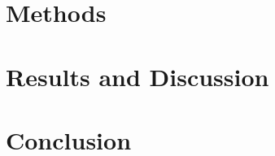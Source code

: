\documentclass[12pt]{article}
\begin{document}
  \section{Methods}\label{chap:methods}
  

  \section{Results and Discussion}\label{chap:results}
  

  \section{Conclusion}\label{chap:conclusion}
  

%   
  
  \printbibliography[title=References]

\end{document}
